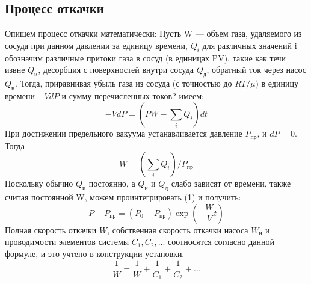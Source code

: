 \documentclass[a4paper, 12pt]{article}
\begin{document}
\subsection{Процесс откачки}
Опишем процесс откачки математически: 
Пусть W --- объем газа, удаляемого из сосуда при данном давлении за единицу времени, $Q_i$ для различных значений i обозначим различные притоки газа в сосуд (в единицах PV), такие как течи извне $Q_\text{и}$, десорбция с поверхностей внутри сосуда $Q_\text{д}$, обратный ток через насос $Q_\text{н}$. Тогда, приравнивая убыль газа из сосуда (с точностью до $RT/\mu$) в единицу времени $-VdP$ и сумму перечисленных токов? имеем:
 \begin{equation}\label{1}
 	-VdP = (PW - \sum_i Q_i)dt
 \end{equation}
 При достижении предельного вакуума устанавливается давление $P_{\text{пр}}$, и $dP = 0$. Тогда
 \begin{equation}\label{2}
 	 W = ( \sum_i Q_i )/P_{\text{пр}}
 \end{equation}
 Поскольку обычно $Q_\text{и}$ постоянно, а $Q_\text{н}$ и $Q_\text{д}$ слабо зависят от времени, также считая постоянной W, можем проинтегрировать (1) и получить:
 \begin{equation}\label{3}
 	P - P_{\text{пр}} = (P_0 - P_{\text{пр}})\exp(-\frac{W}{V}t)
 \end{equation}
Полная скорость откачки $W$, собственная скорость откачки насоса $W_{\text{н}}$ и проводимости элементов системы $C_1, C_2,...$ соотносятся согласно данной формуле, и это учтено в конструкции установки.
 \begin{equation}\label{4}
 \frac{1}{W} = \frac{1}{W} + \frac{1}{C_1} + \frac{1}{C_2} + ...
\end{equation}
\end{document}
